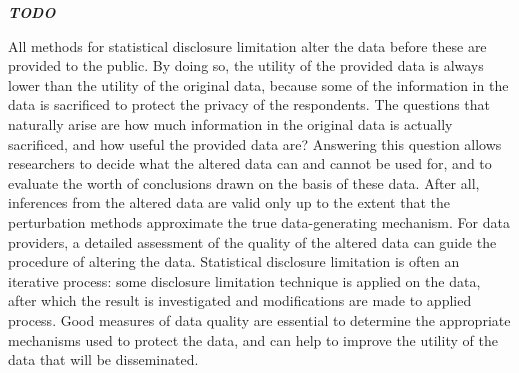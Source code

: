 \documentclass[
]{article}
\begin{document}
\textbf{\emph{TODO}}

All methods for statistical disclosure limitation alter the data before
these are provided to the public. By doing so, the utility of the
provided data is always lower than the utility of the original data,
because some of the information in the data is sacrificed to protect the
privacy of the respondents. The questions that naturally arise are how
much information in the original data is actually sacrificed, and how
useful the provided data are? Answering this question allows researchers
to decide what the altered data can and cannot be used for, and to
evaluate the worth of conclusions drawn on the basis of these data.
After all, inferences from the altered data are valid only up to the
extent that the perturbation methods approximate the true
data-generating mechanism. For data providers, a detailed assessment of
the quality of the altered data can guide the procedure of altering the
data. Statistical disclosure limitation is often an iterative process:
some disclosure limitation technique is applied on the data, after which
the result is investigated and modifications are made to applied
process. Good measures of data quality are essential to determine the
appropriate mechanisms used to protect the data, and can help to improve
the utility of the data that will be disseminated.
\end{document}
